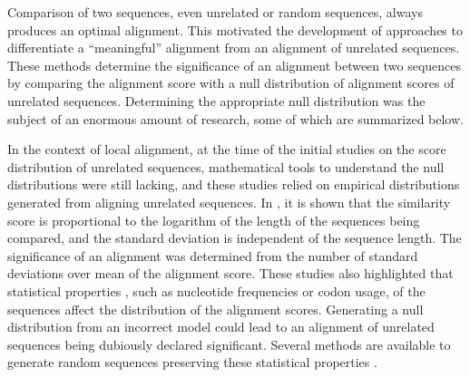 Comparison of two sequences, even unrelated or random sequences, always
produces an optimal alignment. This motivated the development of
approaches to differentiate a ``meaningful'' alignment from an alignment
of unrelated sequences. These methods determine the significance of an
alignment between two sequences by comparing the alignment score with a
null distribution of alignment scores of unrelated sequences.
Determining the appropriate null distribution was the subject of an
enormous amount of research, some of which are summarized below.

In the context of local alignment, at the time of the initial studies on
the score distribution of unrelated sequences, mathematical tools to
understand the null distributions were still lacking, and these studies
relied on empirical distributions generated from aligning unrelated
sequences.
In \cite{smith1985statistical}, it is shown that the similarity score is
proportional to the logarithm of the length of the sequences being
compared, and the standard deviation is independent of the sequence
length. The significance of an alignment was determined from the number
of standard deviations over mean of the alignment score.
These studies \citep{lipman1984statistical} also highlighted that
statistical properties \citep{smith1983statistical}, such as nucleotide
frequencies or codon usage, of the sequences affect the distribution of
the alignment scores.  Generating a null distribution from an incorrect
model could lead to an alignment of unrelated sequences being dubiously
declared significant. Several methods are available to generate random
sequences preserving these statistical properties
\citep{fitch1983random,altschul1985significance}.

